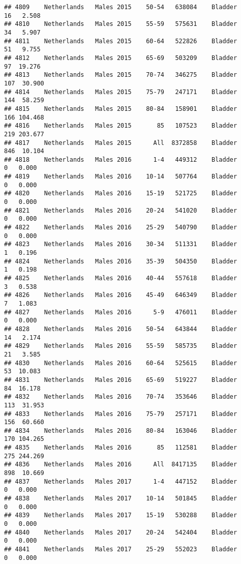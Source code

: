 \documentclass[
]{article}
\begin{document}
\begin{verbatim}
## 4809    Netherlands   Males 2015    50-54   638084    Bladder     16   2.508
## 4810    Netherlands   Males 2015    55-59   575631    Bladder     34   5.907
## 4811    Netherlands   Males 2015    60-64   522826    Bladder     51   9.755
## 4812    Netherlands   Males 2015    65-69   503209    Bladder     97  19.276
## 4813    Netherlands   Males 2015    70-74   346275    Bladder    107  30.900
## 4814    Netherlands   Males 2015    75-79   247171    Bladder    144  58.259
## 4815    Netherlands   Males 2015    80-84   158901    Bladder    166 104.468
## 4816    Netherlands   Males 2015       85   107523    Bladder    219 203.677
## 4817    Netherlands   Males 2015      All  8372858    Bladder    846  10.104
## 4818    Netherlands   Males 2016      1-4   449312    Bladder      0   0.000
## 4819    Netherlands   Males 2016    10-14   507764    Bladder      0   0.000
## 4820    Netherlands   Males 2016    15-19   521725    Bladder      0   0.000
## 4821    Netherlands   Males 2016    20-24   541020    Bladder      0   0.000
## 4822    Netherlands   Males 2016    25-29   540790    Bladder      0   0.000
## 4823    Netherlands   Males 2016    30-34   511331    Bladder      1   0.196
## 4824    Netherlands   Males 2016    35-39   504350    Bladder      1   0.198
## 4825    Netherlands   Males 2016    40-44   557618    Bladder      3   0.538
## 4826    Netherlands   Males 2016    45-49   646349    Bladder      7   1.083
## 4827    Netherlands   Males 2016      5-9   476011    Bladder      0   0.000
## 4828    Netherlands   Males 2016    50-54   643844    Bladder     14   2.174
## 4829    Netherlands   Males 2016    55-59   585735    Bladder     21   3.585
## 4830    Netherlands   Males 2016    60-64   525615    Bladder     53  10.083
## 4831    Netherlands   Males 2016    65-69   519227    Bladder     84  16.178
## 4832    Netherlands   Males 2016    70-74   353646    Bladder    113  31.953
## 4833    Netherlands   Males 2016    75-79   257171    Bladder    156  60.660
## 4834    Netherlands   Males 2016    80-84   163046    Bladder    170 104.265
## 4835    Netherlands   Males 2016       85   112581    Bladder    275 244.269
## 4836    Netherlands   Males 2016      All  8417135    Bladder    898  10.669
## 4837    Netherlands   Males 2017      1-4   447152    Bladder      0   0.000
## 4838    Netherlands   Males 2017    10-14   501845    Bladder      0   0.000
## 4839    Netherlands   Males 2017    15-19   530288    Bladder      0   0.000
## 4840    Netherlands   Males 2017    20-24   542404    Bladder      0   0.000
## 4841    Netherlands   Males 2017    25-29   552023    Bladder      0   0.000

\end{verbatim}
\end{document}
